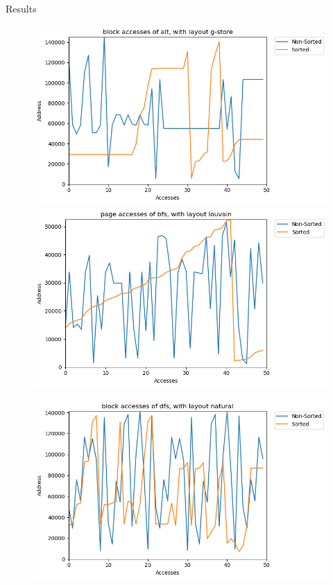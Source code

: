 \documentclass[rgb]{beamer}
\begin{document}
\begin{frame}[allowframebreaks]{Results}
            \framebreak
            \begin{figure}
                \begin{center}
                \includegraphics[keepaspectratio, height=0.8\textheight, width=.45\textwidth]{img/dblp_g-store_alt_block_sil_access_seq.png} \hfill
                \includegraphics[keepaspectratio, height=0.8\textheight, width=.45\textwidth]{img/youtube_louvain_bfs_page_sil_access_seq.png}
                \end{center}
            \end{figure}
            
            \framebreak
            \begin{figure}
                \begin{center}
                \includegraphics[keepaspectratio, height=0.8\textheight, width=\textwidth]{img/dblp_natural_dfs_block_sil_access_seq.png}
                \end{center}
            \end{figure}
        \end{frame}
    
\end{document}
